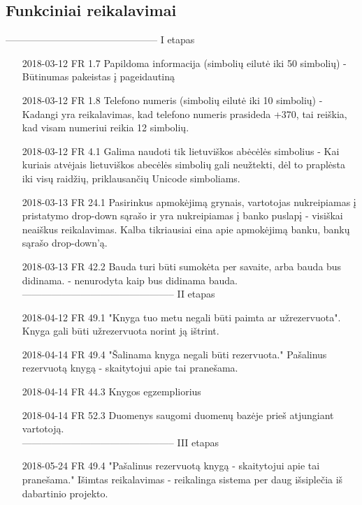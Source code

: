 \documentclass{VUMIFPSkursinis}
\begin{document}
\subsection{Funkciniai reikalavimai}
----------------------------------------------- I etapas
\begin{enumerate}
	\item [2018-03-12] FR 1.7 Papildoma informacija (simbolių eilutė iki 50 simbolių) - Būtinumas pakeistas į pageidautiną
	\item [2018-03-12] FR 1.8 Telefono numeris (simbolių eilutė iki 10 simbolių) - Kadangi yra reikalavimas, kad telefono numeris prasideda +370, tai reiškia, kad visam numeriui reikia 12 simbolių. 
    \item [2018-03-12] FR 4.1 Galima naudoti tik lietuviškos abėcėlės simbolius - Kai kuriais atvėjais lietuviškos abecėlės simbolių gali neužtekti, dėl to praplėsta iki visų raidžių, priklausančių Unicode simboliams.
    \item  [2018-03-13] FR 24.1 Pasirinkus apmokėjimą grynais, vartotojas nukreipiamas į pristatymo 
 drop-down sąrašo ir yra nukreipiamas į banko puslapį - visiškai neaiškus reikalavimas. Kalba tikriausiai eina apie apmokėjimą banku, bankų sąrašo drop-down'ą.
 \item [2018-03-13] FR 42.2 Bauda turi būti sumokėta per savaite, arba bauda bus didinama. - nenurodyta kaip bus didinama bauda. \\
----------------------------------------------- II etapas
 \item [2018-04-12] FR 49.1 "Knyga tuo metu negali būti paimta ar užrezervuota". Knyga gali būti užrezervuota norint ją ištrint.
 \item [2018-04-14] FR 49.4 "Šalinama knyga negali būti rezervuota." Pašalinus rezervuotą knygą - skaitytojui apie tai pranešama.
 \item [2018-04-14] FR 44.3 Knygos egzempliorius
 \item [2018-04-14] FR 52.3 Duomenys saugomi duomenų bazėje prieš atjungiant vartotoją. \\
----------------------------------------------- III etapas
 \item [2018-05-24] FR 49.4 "Pašalinus rezervuotą knygą - skaitytojui apie tai pranešama." Išimtas reikalavimas - reikalinga sistema per daug išsiplečia iš dabartinio projekto.
    
\end{enumerate}
\end{document}
